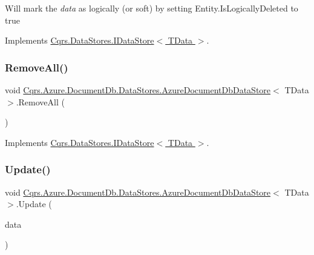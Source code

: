 Will mark the {\itshape data}  as logically (or soft) by setting Entity.\+Is\+Logically\+Deleted to true 



Implements \hyperlink{interfaceCqrs_1_1DataStores_1_1IDataStore_a7ef540796bbe4257296841590bc23478}{Cqrs.\+Data\+Stores.\+I\+Data\+Store$<$ T\+Data $>$}.

\mbox{\label{classCqrs_1_1Azure_1_1DocumentDb_1_1DataStores_1_1AzureDocumentDbDataStore_a0d72cc318e98e01b3dbed86d412a8778}} 
\subsubsection{\texorpdfstring{Remove\+All()}{RemoveAll()}}
{\footnotesize\ttfamily void \hyperlink{classCqrs_1_1Azure_1_1DocumentDb_1_1DataStores_1_1AzureDocumentDbDataStore}{Cqrs.\+Azure.\+Document\+Db.\+Data\+Stores.\+Azure\+Document\+Db\+Data\+Store}$<$ T\+Data $>$.Remove\+All (\begin{DoxyParamCaption}{ }\end{DoxyParamCaption})}



Implements \hyperlink{interfaceCqrs_1_1DataStores_1_1IDataStore_aead8d7a39a717d29af05daf7b64bea94}{Cqrs.\+Data\+Stores.\+I\+Data\+Store$<$ T\+Data $>$}.

\mbox{\label{classCqrs_1_1Azure_1_1DocumentDb_1_1DataStores_1_1AzureDocumentDbDataStore_a55f504ed5094e3041a266b958424b1a2}} 
\subsubsection{\texorpdfstring{Update()}{Update()}}
{\footnotesize\ttfamily void \hyperlink{classCqrs_1_1Azure_1_1DocumentDb_1_1DataStores_1_1AzureDocumentDbDataStore}{Cqrs.\+Azure.\+Document\+Db.\+Data\+Stores.\+Azure\+Document\+Db\+Data\+Store}$<$ T\+Data $>$.Update (\begin{DoxyParamCaption}\item[{T\+Data}]{data }\end{DoxyParamCaption})}



